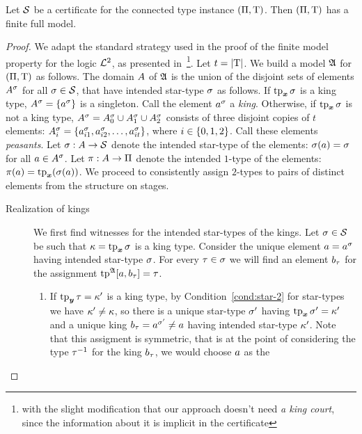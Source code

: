 \begin{lemma}\label{lem:cert-expand}
Let $\mathcal{S}$ be a certificate for the connected type instance $(\Pi,\mathrm{T})$.
Then $(\Pi,\mathrm{T})$ has a finite full model.
\end{lemma}
\begin{proof}
We adapt the standard strategy used in the proof of the finite model property
for the logic $\mathcal{L}^{2}$, as presented in~\cite{gradel1999logics}\footnote{with
the slight modification that our approach doesn't need \emph{a king court},
since the information about it is implicit in the certificate}.
Let $t = \left|\mathrm{T}\right|$.
We build a model $\mathfrak{A}$ for $(\Pi,\mathrm{T})$ as follows.
The domain $A$ of $\mathfrak{A}$ is the union of the disjoint sets of elements
$A^\sigma$ for all $\sigma \in \mathcal{S}$, that have intended star-type $\sigma$
as follows.
If $\operatorname{tp}_{\bm{x}}\sigma$ is a king type, $A^\sigma = \left\{a^\sigma\right\}$ is a
singleton. Call the element $a^\sigma$ a \emph{king}.
Otherwise, if $\operatorname{tp}_{\bm{x}}\sigma$ is not a king type, $A^\sigma = A^\sigma_0
\cup A^\sigma_1 \cup A^\sigma_2$ consists of three disjoint copies of $t$
elements:  $A^\sigma_i = \left\{a^\sigma_{i1}, a^\sigma_{i2}, \dots,
a^\sigma_{it}\right\}$, where $i \in \left\{0,1,2\right\}$. Call these elements
\emph{peasants}.
Let $\sigma : A \to \mathcal{S}$ denote the intended star-type of the elements:
$\sigma(a) = \sigma$ for all $a \in A^\sigma$.
Let $\pi : A \to \Pi$ denote the intended $1$-type of the elements:
$\pi(a) = \operatorname{tp}_{\bm{x}}(\sigma(a))$.
We proceed to consistently assign $2$-types to pairs of distinct elements from
the structure on stages.
\begin{description}
  \item[Realization of kings] We first find witnesses for the intended
  star-types of the kings.
  Let $\sigma \in \mathcal{S}$ be such that $\kappa = \operatorname{tp}_{\bm{x}}\sigma$ is a king type.
  Consider the unique element $a = a^\sigma$ having intended star-type
  $\sigma$.
  For every $\tau \in \sigma$ we will find an element $b_\tau$ for the
  assignment $\operatorname{tp}^{\mathfrak{A}}[a,b_\tau] = \tau$.
  \begin{enumerate}
  \item If $\operatorname{tp}_{\bm{y}}\tau = {\kappa'}$ is a king type, by Condition~\ref{cond:star-2}
  for star-types we have ${\kappa'} \neq \kappa$, so there is a unique star-type
  $\sigma'$ having $\operatorname{tp}_{\bm{x}}\sigma' = \kappa'$ and a unique king $b_\tau =
  a^{\sigma'} \neq a$ having intended star-type ${\kappa'}$. Note that this
  assigment is symmetric, that is at the point of considering the type
  $\tau^{-1}$ for the king $b_\tau$, we would choose $a$ as the

\end{enumerate}
\end{description}
\end{proof}

